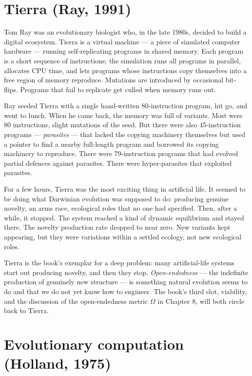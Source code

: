 \section{Tierra (Ray, 1991)}

Tom Ray was an evolutionary biologist who, in the late 1980s, decided
to build a digital ecosystem. Tierra is a virtual machine --- a piece
of simulated computer hardware --- running self-replicating programs in
shared memory. Each program is a short sequence of instructions; the
simulation runs all programs in parallel, allocates CPU time, and lets
programs whose instructions copy themselves into a free region of
memory reproduce. Mutations are introduced by occasional bit-flips.
Programs that fail to replicate get culled when memory runs out.

Ray seeded Tierra with a single hand-written 80-instruction program,
hit go, and went to lunch. When he came back, the memory was full of
variants. Most were 80 instructions, slight mutations of the seed. But
there were also 45-instruction programs --- \emph{parasites} --- that
lacked the copying machinery themselves but used a pointer to find a
nearby full-length program and borrowed its copying machinery to
reproduce. There were 79-instruction programs that had evolved partial
defences against parasites. There were hyper-parasites that exploited
parasites.

For a few hours, Tierra was the most exciting thing in artificial life.
It seemed to be doing what Darwinian evolution was supposed to do:
producing genuine novelty, an arms race, ecological roles that no one
had specified. Then, after a while, it stopped. The system reached a
kind of dynamic equilibrium and stayed there. The novelty production
rate dropped to near zero. New variants kept appearing, but they were
variations within a settled ecology, not new ecological roles.

Tierra is the book's exemplar for a deep problem: many artificial-life
systems start out producing novelty, and then they stop.
\emph{Open-endedness} --- the indefinite production of genuinely new
structure --- is something natural evolution seems to do and that we do
not yet know how to engineer. The book's third slot, viability, and the
discussion of the open-endedness metric $\Omega$ in Chapter 8, will
both circle back to Tierra.

\section{Evolutionary computation (Holland, 1975)}

